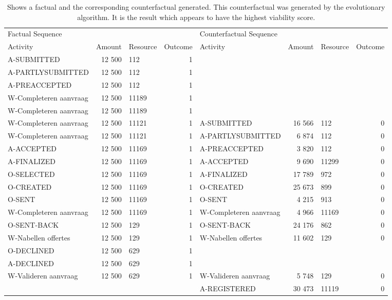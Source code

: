 \begin{table}
\caption{Shows a factual and the corresponding counterfactual generated. This counterfactual was generated by the evolutionary algorithm. It is the result which appears to have the highest viability score.}
\label{tbl:example-cf-evo}
\begin{tabular}{lrlrlrlr}
\toprule
\multicolumn{4}{l}{Factual Sequence} & \multicolumn{4}{l}{Counterfactual Sequence} \\
Activity & Amount & Resource & Outcome & Activity & Amount & Resource & Outcome \\
\midrule
A-SUBMITTED & 12 500 & 112 & 1 &  &  &  &  \\
A-PARTLYSUBMITTED & 12 500 & 112 & 1 &  &  &  &  \\
A-PREACCEPTED & 12 500 & 112 & 1 &  &  &  &  \\
W-Completeren aanvraag & 12 500 & 11189 & 1 &  &  &  &  \\
W-Completeren aanvraag & 12 500 & 11189 & 1 &  &  &  &  \\
W-Completeren aanvraag & 12 500 & 11121 & 1 & A-SUBMITTED & 16 566 & 112 & 0 \\
W-Completeren aanvraag & 12 500 & 11121 & 1 & A-PARTLYSUBMITTED & 6 874 & 112 & 0 \\
A-ACCEPTED & 12 500 & 11169 & 1 & A-PREACCEPTED & 3 820 & 112 & 0 \\
A-FINALIZED & 12 500 & 11169 & 1 & A-ACCEPTED & 9 690 & 11299 & 0 \\
O-SELECTED & 12 500 & 11169 & 1 & A-FINALIZED & 17 789 & 972 & 0 \\
O-CREATED & 12 500 & 11169 & 1 & O-CREATED & 25 673 & 899 & 0 \\
O-SENT & 12 500 & 11169 & 1 & O-SENT & 4 215 & 913 & 0 \\
W-Completeren aanvraag & 12 500 & 11169 & 1 & W-Completeren aanvraag & 4 966 & 11169 & 0 \\
O-SENT-BACK & 12 500 & 129 & 1 & O-SENT-BACK & 24 176 & 862 & 0 \\
W-Nabellen offertes & 12 500 & 129 & 1 & W-Nabellen offertes & 11 602 & 129 & 0 \\
O-DECLINED & 12 500 & 629 & 1 &  &  &  &  \\
A-DECLINED & 12 500 & 629 & 1 &  &  &  &  \\
W-Valideren aanvraag & 12 500 & 629 & 1 & W-Valideren aanvraag & 5 748 & 129 & 0 \\
 &  &  &  & A-REGISTERED & 30 473 & 11119 & 0 \\
\bottomrule
\end{tabular}
\end{table}
